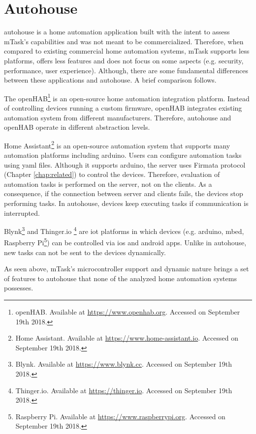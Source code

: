 \section{Autohouse}

\gls{autohouse} is a home automation application built with the intent to assess \gls{mTask}'s capabilities and was not meant to be commercialized. Therefore, when compared to existing commercial home automation systems, \gls{mTask} supports less platforms, offers less features and does not focus on some aspects (e.g. security, performance, user experience). Although, there are some fundamental differences between these applications and \gls{autohouse}. A brief comparison follows.

The openHAB\footnote{openHAB. Available at \url{https://www.openhab.org}. Accessed on September 19th 2018.} is an open-source home automation integration platform. Instead of controlling devices running a custom firmware, openHAB integrates existing automation system from different manufacturers. Therefore, \gls{autohouse} and openHAB operate in different abstraction levels.

Home Assistant\footnote{Home Assistant. Available at \url{https://www.home-assistant.io}. Accessed on September 19th 2018.} is an open-source automation system that supports many automation platforms including \gls{arduino}. Users can configure automation tasks using \gls{yaml} files. Although it supports \gls{arduino}, the server uses Firmata protocol (Chapter \ref{chap:related}) to control the devices. Therefore, evaluation of automation tasks is performed on the server, not on the clients. As a consequence, if the connection  between server and clients fails, the devices stop performing tasks. In \gls{autohouse}, devices keep executing tasks if communication is interrupted.

Blynk\footnote{Blynk. Available at \url{https://www.blynk.cc}. Accessed on September 19th 2018.} and Thinger.io \footnote{Thinger.io. Available at \url{https://thinger.io}. Accessed on September 19th 2018.} are \ac{iot} platforms in which devices (e.g. \gls{arduino}, \gls{mbed}, Raspberry Pi\footnote{Raspberry Pi. Available at \url{https://www.raspberrypi.org}. Accessed on September 19th 2018.}) can be controlled via \gls{ios} and \gls{android} apps. Unlike in \gls{autohouse}, new tasks can not be sent to the devices dynamically. 

As seen above, \gls{mTask}'s microcontroller support and dynamic nature brings a set of features to \gls{autohouse} that none of the analyzed home automation systems possesses.